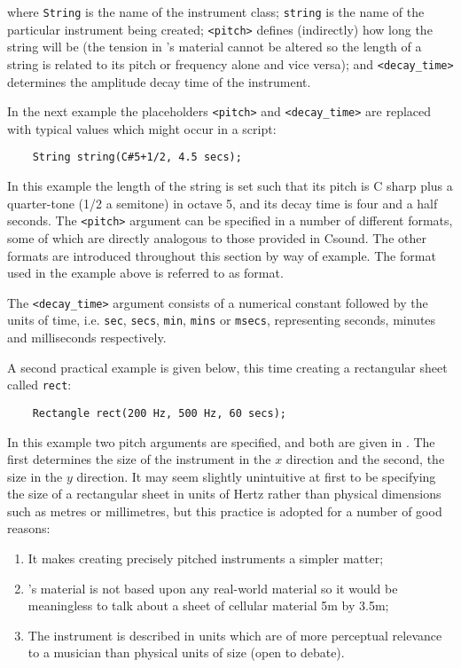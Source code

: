where \verb|String| is the name of the instrument class; \verb|string|
is the name of the particular instrument being created;
\verb|<pitch>| defines (indirectly) how long the string will be
(the tension in \tao's material cannot be altered so the length of a string
is related to its pitch or frequency alone and vice versa); and
\verb|<decay_time>| determines the amplitude decay time of the instrument.

In the next example the placeholders \verb|<pitch>| and \verb|<decay_time>|
are replaced with typical values which might occur in a script:

\begin{verbatim}
    String string(C#5+1/2, 4.5 secs);
\end{verbatim}

In this example the length of the string is set such that its pitch
is C sharp plus a quarter-tone (1/2 a semitone) in octave 5, and
its decay time is four and a half seconds. 
The \verb|<pitch>| argument can be specified in a number of different
formats, some of which are directly analogous to those provided in
Csound. The other formats are introduced throughout this section
by way of example. The format used in the example above is referred to
as  format.

The \verb|<decay_time>| argument consists of a numerical constant
followed by the units of time, i.e. \verb|sec|, \verb|secs|, \verb|min|,
\verb|mins| or \verb|msecs|, representing seconds, minutes and milliseconds
respectively.

A second practical example is given below, this time creating a
rectangular sheet called \verb|rect|:

\begin{verbatim}
    Rectangle rect(200 Hz, 500 Hz, 60 secs);
\end{verbatim}

In this example two pitch arguments are specified, and both are given
in . The first
determines the size of the instrument in the $x$ direction and
the second, the size in the $y$ direction. It may seem slightly
unintuitive at first to be specifying the size of a rectangular
sheet in units of Hertz rather than physical dimensions such
as metres or millimetres, but this practice is adopted
for a number of good reasons:

\begin{enumerate}
\item It makes creating precisely pitched instruments a simpler matter;
\item \tao's material is not based upon any real-world material so
it would be meaningless to talk about a sheet of cellular material 5m by 3.5m;
\item The instrument is described in units which are of more perceptual
relevance to a musician than physical units of size (open to debate).
\end{enumerate}

